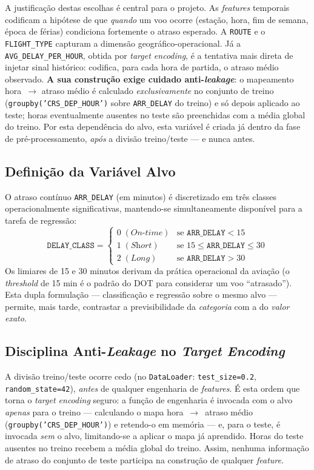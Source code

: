\documentclass[conference]{IEEEtran}
\begin{document}
A justificação destas escolhas é central para o projeto. As \textit{features}
temporais codificam a hipótese de que \emph{quando} um voo ocorre (estação,
hora, fim de semana, época de férias) condiciona fortemente o atraso esperado.
A \texttt{ROUTE} e o \texttt{FLIGHT\_TYPE} capturam a dimensão
geográfico-operacional. Já a \texttt{AVG\_DELAY\_PER\_HOUR}, obtida por
\textit{target encoding}, é a tentativa mais direta de injetar sinal histórico:
codifica, para cada hora de partida, o atraso médio observado. \textbf{A sua
construção exige cuidado anti-\textit{leakage}}: o mapeamento hora~$\rightarrow$
atraso médio é calculado \emph{exclusivamente} no conjunto de treino
(\texttt{groupby('CRS\_DEP\_HOUR')} sobre \texttt{ARR\_DELAY} do treino) e só
depois aplicado ao teste; horas eventualmente ausentes no teste são preenchidas
com a média global do treino. Por esta dependência do alvo, esta variável é
criada já dentro da fase de pré-processamento, \emph{após} a divisão
treino/teste — e nunca antes.

\subsection{Definição da Variável Alvo}
O atraso contínuo \texttt{ARR\_DELAY} (em minutos) é discretizado em três
classes operacionalmente significativas, mantendo-se simultaneamente disponível
para a tarefa de regressão:
\begin{equation}
\texttt{DELAY\_CLASS} =
\begin{cases}
0 \;(\textit{On-time}) & \text{se } \texttt{ARR\_DELAY} < 15 \\
1 \;(\textit{Short})   & \text{se } 15 \leq \texttt{ARR\_DELAY} \leq 30 \\
2 \;(\textit{Long})    & \text{se } \texttt{ARR\_DELAY} > 30
\end{cases}
\end{equation}
Os limiares de 15 e 30 minutos derivam da prática operacional da aviação (o
\textit{threshold} de 15 min é o padrão do DOT para considerar um voo
``atrasado''). Esta dupla formulação — classificação e regressão sobre o mesmo
alvo — permite, mais tarde, contrastar a previsibilidade da \emph{categoria}
com a do \emph{valor exato}.

\subsection{Disciplina Anti-\textit{Leakage} no \textit{Target Encoding}}
A divisão treino/teste ocorre cedo (no \texttt{DataLoader}:
\texttt{test\_size=0.2}, \texttt{random\_state=42}), \emph{antes} de qualquer
engenharia de \textit{features}. É esta ordem que torna o \textit{target
encoding} seguro: a função de engenharia é invocada com o alvo \emph{apenas}
para o treino — calculando o mapa hora~$\rightarrow$~atraso médio
(\texttt{groupby('CRS\_DEP\_HOUR')}) e retendo-o em memória — e, para o teste, é
invocada \emph{sem} o alvo, limitando-se a aplicar o mapa já aprendido. Horas do
teste ausentes no treino recebem a média global do treino. Assim, nenhuma
informação de atraso do conjunto de teste participa na construção de qualquer
\textit{feature}.
\end{document}
